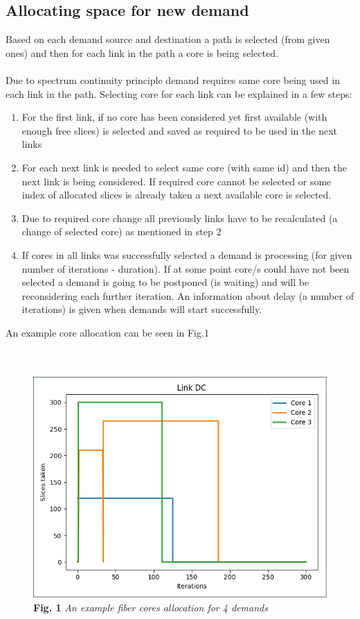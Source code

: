 \documentclass[conference]{IEEEtran}
\begin{document}
\subsection{Allocating space for new demand}
Based on each demand source and destination a path is selected (from given ones) and then for each link in the path a core is being selected.
\\ \\
Due to spectrum continuity principle demand requires same core being used in each link in the path. Selecting core for each link can be explained in a few steps:
\begin{enumerate}
\item For the first link, if no core has been considered yet first available (with enough free slices) is selected and saved as required to be used in the next links
\item For each next link is needed to select same core (with same id) and then the next link is being considered. If required core cannot be selected or some index of allocated slices is already taken a next available core is selected.
\item Due to required core change all previously links have to be recalculated (a change of selected core) as mentioned in step 2
\item If cores in all links was successfully selected a demand is processing (for given number of iterations - duration). If at some point core/s could have not been selected a demand is going to be postponed (is waiting) and will be reconsidering each further iteration. An information about delay (a number of iterations) is given when demands will start successfully.
\end{enumerate}
An example core allocation can be seen in Fig.1
\\ \\ \\
\begin{figure}[H]
\includegraphics[width=\linewidth]{plot_link.png}
\\
\textbf{Fig. 1} \textit{An example fiber cores allocation for 4 demands}
\end{figure}
\end{document}
